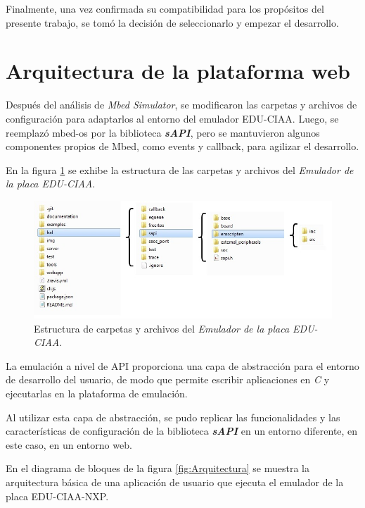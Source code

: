 Finalmente, una vez confirmada su compatibilidad para los propósitos del presente trabajo, se tomó la decisión de seleccionarlo y empezar el desarrollo.


\section{Arquitectura de la plataforma web}

Después del análisis de \textit{Mbed Simulator}, se modificaron las carpetas y archivos de configuración para adaptarlos al entorno del emulador EDU-CIAA. Luego, se reemplazó \textquotedbl mbed-os\textquotedbl{}  por la biblioteca \textit{\textbf{sAPI}}, pero se mantuvieron algunos componentes propios de Mbed, como \textquotedbl events\textquotedbl{}  y \textquotedbl callback\textquotedbl, para agilizar el desarrollo.
  
En la figura \ref{fig:estructuraCiaa} se exhibe la estructura de las carpetas y archivos del  \textit{Emulador de la placa EDU-CIAA}.

\begin{figure}[ht]
	\centering
	\includegraphics[scale=.52]{./Figures/estructuraCiaa.jpg}
	\caption{Estructura de carpetas y archivos del \textit{Emulador de la placa EDU-CIAA}.}
	\label{fig:estructuraCiaa}
\end{figure}
 

La emulación a nivel de API proporciona una capa de abstracción para el entorno de desarrollo del usuario, de modo que permite escribir aplicaciones en \textit{C} y ejecutarlas en la plataforma de emulación. 

Al utilizar esta capa de abstracción, se pudo replicar las funcionalidades y las características de configuración de la biblioteca \textit{\textbf{sAPI}} en un entorno diferente, en este caso, en un entorno web.


En el diagrama de bloques de la figura \ref{fig:Arquitectura} se muestra la arquitectura básica de una aplicación de usuario que ejecuta el emulador de la placa EDU-CIAA-NXP.

